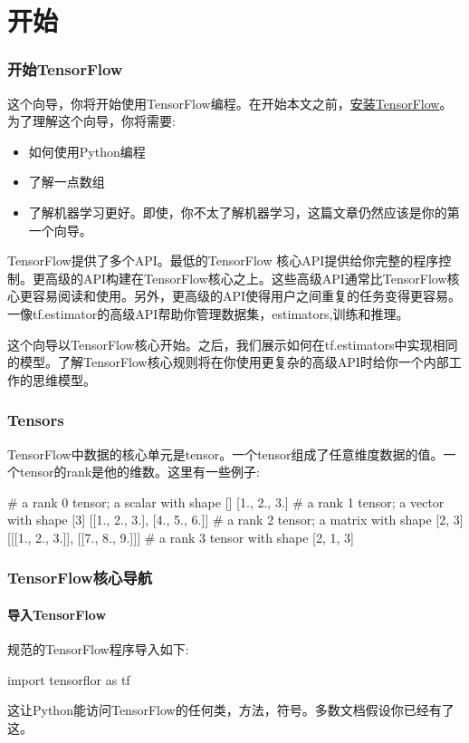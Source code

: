 \chapter{开始}
\subsection{开始TensorFlow}
这个向导，你将开始使用TensorFlow编程。在开始本文之前，\href{https://www.tensorflow.org/install/index}{安装TensorFlow}。为了理解这个向导，你将需要:
\begin{itemize}
\item 如何使用Python编程
\item 了解一点数组
\item 了解机器学习更好。即使，你不太了解机器学习，这篇文章仍然应该是你的第一个向导。
\end{itemize}
TensorFlow提供了多个API。最低的TensorFlow 核心API提供给你完整的程序控制。更高级的API构建在TensorFlow核心之上。这些高级API通常比TensorFlow核心更容易阅读和使用。另外，更高级的API使得用户之间重复的任务变得更容易。一像tf.estimator的高级API帮助你管理数据集，estimators,训练和推理。

这个向导以TensorFlow核心开始。之后，我们展示如何在tf.estimators中实现相同的模型。了解TensorFlow核心规则将在你使用更复杂的高级API时给你一个内部工作的思维模型。
\subsection{Tensors}
TensorFlow中数据的核心单元是tensor。一个tensor组成了任意维度数据的值。一个tensor的rank是他的维数。这里有一些例子:
\begin{pythoncode}
# a rank 0 tensor; a scalar with shape []
[1., 2., 3.] # a rank 1 tensor; a vector with shape [3]
[[1., 2., 3.], [4., 5., 6.]] # a rank 2 tensor; a matrix with shape [2, 3]
[[[1., 2., 3.]], [[7., 8., 9.]]] # a rank 3 tensor with shape [2, 1, 3]
\end{pythoncode}
\subsection{TensorFlow核心导航}
\subsubsection{导入TensorFlow}
规范的TensorFlow程序导入如下:
\begin{pythoncode}
import tensorflor as tf 
\end{pythoncode}
这让Python能访问TensorFlow的任何类，方法，符号。多数文档假设你已经有了这。
